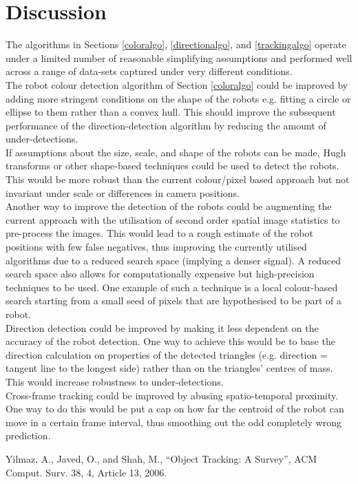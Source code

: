 \documentclass[10pt,a4paper]{article}
\begin{document}
\section{Discussion}\label{discussion}
The algorithms in Sections \ref{coloralgo}, \ref{directionalgo}, and 
\ref{trackingalgo} operate under a limited number of reasonable simplifying
assumptions and performed well across a range of data-sets captured under very
different conditions.\\
The robot colour detection algorithm of Section \ref{coloralgo} could be improved
by adding more stringent conditions on the shape of the robots e.g. fitting a
circle or ellipse to them rather than a convex hull. This should improve the
subsequent performance of the direction-detection algorithm by reducing the
amount of under-detections.\\
If assumptions about the size, scale, and shape of the robots can be made, Hugh 
transforms or other shape-based techniques could be used to detect the robots.
This would be more robust than the current colour/pixel based approach but not 
invariant under scale or differences in camera positions.\\
Another way to improve the detection of the robots could be augmenting the
current approach with the utilisation of second order spatial image statistics
to pre-process the images. This would lead to a rough estimate of the robot
positions with few false negatives, thus improving the currently utilised
algorithms due to a reduced search space (implying a denser signal). A reduced
search space also allows for computationally expensive but high-precision 
techniques to be used. One example of such a technique is a local colour-based
search starting from a small seed of pixels that are hypothesised to be part of
a robot.\\
Direction detection could be improved by making it less dependent on the
accuracy of the robot detection. One way to achieve this would be to base the 
direction calculation on properties of the detected triangles (e.g. direction =
tangent line to the longest side) rather than on the triangles' centres of 
mass. This would increase robustness to under-detections.\\
Cross-frame tracking could be improved by abusing spatio-temporal proximity. One
way to do this would be put a cap on how far the centroid of the robot can move 
in a certain frame interval, thus smoothing out the odd completely wrong 
prediction.


\begin{thebibliography}{10}
 Yilmaz, A., Javed, O., and Shah, M., 
``Object Tracking: A Survey'', 
ACM Comput. Surv. 38, 4, Article 13, 2006.  
\end{thebibliography}
\end{document}
